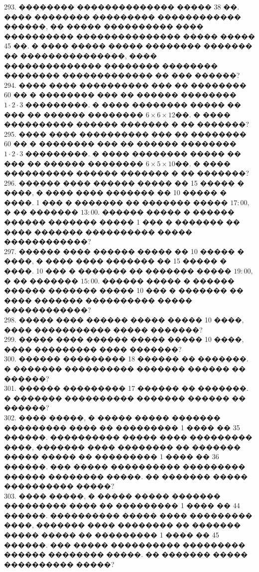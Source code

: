 \documentclass[12pt]{article}
\begin{document}
293. �������� �������������� ����� 38 ��. ���� �������� ��������� ������������ ������, �� ����� ���������� ���� ���������� ��������������� ����� ����� 45 ��. � ���� ����� ����� �������� ������� �� ���������������, ���� �������������� �������� �������� �������� ������������� �� ��� ������?\\
294. ���� ���� ���������� ��� �� �������� 60 �� � �������� ��� �� ������ �������� $1\cdot2\cdot3$ ���������. � ���� �������� ����� �� ��� �� ������ �������� $6\times6\times12$��. � ���� ���������� ������ ������� � �� �������?\\
295. ���� ���� ���������� ��� �� �������� 60 �� � �������� ��� �� ������ �������� $1\cdot2\cdot3$ ���������. � ���� �������� ����� �� ��� �� ������ �������� $6\times5\times10$��. � ���� ���������� ������ ������� � �� �������?\\
296. ������ ���� ������ ����� �� 15 ����� � ����, � ���� ���� ������� �� 10 ����� � ����. 1 ��� � ������� �� ������� ����� $17:00,$ � �� ������� $13:00.$ ������ ����� � ������ ������ ������� ����� 1 ��� � ������� �� ���� ������� ���������� ����� ������������?\\
297. ������ ���� ������ ����� �� 10 ����� � ����, � ���� ���� ������� �� 15 ����� � ����. 10 ��� � ������� �� ������� ����� $19:00,$ � �� ������� $15:00.$ ������ ����� � ������ ������ ������� ����� 10 ��� � ������� �� ���� ������� ���������� ����� ������������?\\
298. ����� ���� ������ ����� ����� 10 ����, ���� ����������� ����� �������?\\
299. ����� ���� ������ ����� ����� 10 ����, ���� ��������� ���� �������?\\
300. ������ ��������� 18 ������ �� �������. � ������� ���������� ������� ������ �� ������?\\
301. ������ ��������� 17 ������ �� �������. � ������� ���������� ������� ������ �� ������?\\
302. ���� �����, � ����� ����� ������� ��������� ���� �� ��������� 1 ���� �� 35 ������. ���������� ����� ���� ��������� ����, ������� ���� �������� �� ������� ����� ����� �� ��������� 1 ���� �� 36 ������. ��� ����� ���������� ��������� ������ �������� �����. �� ������� ����� ���������� �����?\\
303. ���� �����, � ����� ����� ������� ��������� ���� �� ��������� 1 ���� �� 44 ������. ���������� ����� ���� ��������� ����, ������� ���� �������� �� ������� ����� ����� �� ��������� 1 ���� �� 45 ������. ��� ����� ���������� ��������� ������ �������� �����. �� ������� ����� ���������� �����?\\
\end{document}
